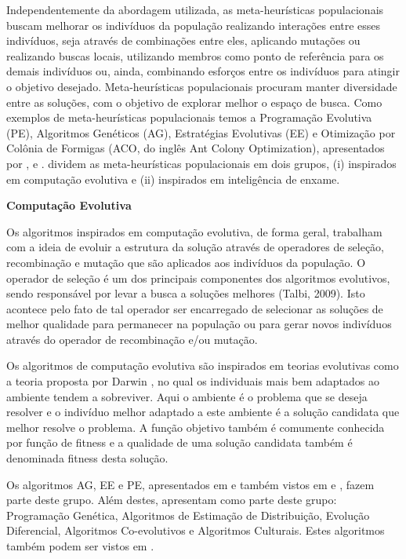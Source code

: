 Independentemente da abordagem utilizada, as meta-heurísticas populacionais buscam melhorar os indivíduos da população realizando interações entre esses indivíduos, seja através de combinações entre eles, aplicando mutações ou realizando buscas locais, utilizando membros como ponto de referência para os demais indivíduos ou, ainda, combinando esforços entre os indivíduos para atingir o objetivo desejado. Meta-heurísticas populacionais procuram manter diversidade entre as soluções, com o objetivo de explorar melhor o espaço de busca. Como exemplos de meta-heurísticas populacionais temos a Programação Evolutiva (PE), Algoritmos Genéticos (AG), Estratégias Evolutivas (EE) e Otimização por Colônia de Formigas (ACO, do inglês Ant Colony Optimization), apresentados por ,  e . dividem as meta-heurísticas populacionais em dois grupos, (i) inspirados em computação evolutiva e (ii) inspirados em inteligência de enxame. 

\textbf{Computação Evolutiva}

Os algoritmos inspirados em computação evolutiva, de forma geral, trabalham com a ideia de evoluir a estrutura da solução através de operadores de seleção, recombinação e mutação que são aplicados aos indivíduos da população. O operador de seleção é um dos principais componentes dos algoritmos evolutivos, sendo responsável por levar a busca a soluções melhores (Talbi, 2009). Isto acontece pelo fato de tal operador ser encarregado de selecionar as soluções de melhor qualidade para permanecer na população ou para gerar novos indivíduos através do operador de recombinação e/ou mutação. 

Os algoritmos de computação evolutiva são inspirados em teorias evolutivas \cite{Talbi2009} como a teoria proposta por Darwin \cite{Darwin1859}, no qual os individuais mais bem adaptados ao ambiente tendem a sobreviver. Aqui o ambiente é o problema que se deseja resolver e o indivíduo melhor adaptado a este ambiente é a solução candidata que melhor resolve o problema. A função objetivo também é comumente conhecida por função de fitness e a qualidade de uma solução candidata também é denominada fitness desta solução.

Os algoritmos AG, EE e PE, apresentados em  e também vistos em  e , fazem parte deste grupo. Além destes,  apresentam como parte deste grupo: Programação Genética, Algoritmos de Estimação de Distribuição, Evolução Diferencial, Algoritmos Co-evolutivos e Algoritmos Culturais. Estes algoritmos também podem ser vistos em . 


